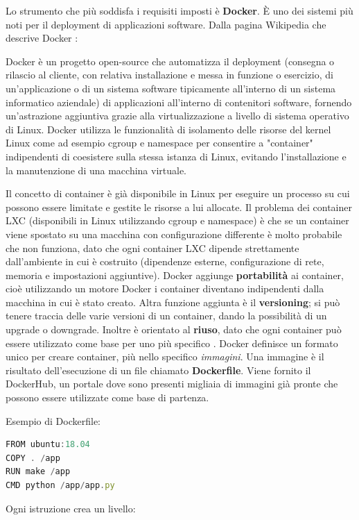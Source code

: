 \documentclass[a4paper,10pt]{memoir}
\begin{document}
Lo strumento che più soddisfa i requisiti imposti è \textbf{Docker}.
È uno dei sistemi più noti per il deployment di applicazioni software. Dalla pagina Wikipedia che descrive Docker
\cite{wikidocker}:
\begin{quoting}[font=itshape, begintext={``}, endtext={``}]
Docker è un progetto open-source che automatizza il deployment (consegna o rilascio al cliente, con relativa installazione e messa in funzione o esercizio, di un'applicazione o di un sistema software tipicamente all'interno di un sistema informatico aziendale) di applicazioni all'interno di contenitori software, fornendo un'astrazione aggiuntiva grazie alla virtualizzazione a livello di sistema operativo di Linux. Docker utilizza le funzionalità di isolamento delle risorse del kernel Linux come ad esempio cgroup e namespace per consentire a "container" indipendenti di coesistere sulla stessa istanza di Linux, evitando l'installazione e la manutenzione di una macchina virtuale.
\end{quoting}

Il concetto di container è già disponibile in Linux per eseguire un processo su cui possono essere limitate e gestite le risorse a lui allocate. Il problema dei container LXC (disponibili in Linux utilizzando cgroup e namespace) è che se un container viene spostato su una macchina con configurazione differente è molto probabile che non funziona, dato che ogni container LXC dipende strettamente dall'ambiente in cui è costruito (dipendenze esterne, configurazione di rete, memoria e
impostazioni aggiuntive). Docker aggiunge \textbf{portabilità} ai container, cioè utilizzando un motore Docker i container diventano indipendenti dalla macchina in cui è stato creato. Altra funzione aggiunta è il \textbf{versioning}; si può tenere traccia delle varie versioni di un container, dando la possibilità di un upgrade o downgrade. Inoltre è orientato al \textbf{riuso},     dato che ogni container può essere utilizzato come base per uno più specifico \cite{docker-portability}.
Docker definisce un formato unico per creare container, più nello specifico \textit{immagini}. Una immagine è il risultato dell'esecuzione di un file chiamato \textbf{Dockerfile}. Viene fornito il DockerHub, un portale dove sono presenti migliaia di immagini già pronte che possono essere utilizzate come base di partenza.

\vspace{0.02\textwidth}
\begin{center}
Esempio di Dockerfile:
\begin{lstlisting}[language=Javascript]
FROM ubuntu:18.04
COPY . /app
RUN make /app
CMD python /app/app.py
\end{lstlisting}
\end{center}
Ogni istruzione crea un livello:
\end{document}
